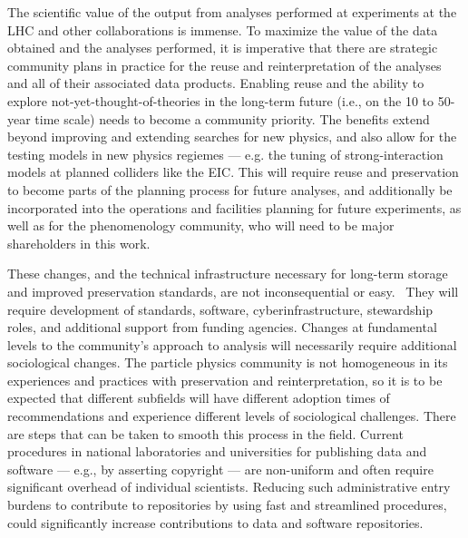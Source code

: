 \documentclass[11pt]{article}
\begin{document}
The scientific value of the output from analyses performed at experiments at the \gls{LHC} and other collaborations is immense.
To maximize the value of the data obtained and the analyses performed, it is imperative that there are strategic community plans in practice for the reuse and reinterpretation of the analyses and all of their associated data products.
Enabling reuse and the ability to explore not-yet-thought-of-theories in the long-term future (i.e., on the 10 to 50-year time scale) needs to become a community priority.
The benefits extend beyond improving and extending searches for new physics, and also allow for the testing models in new physics regiemes --- e.g. the tuning of strong-interaction models at planned colliders like the \gls{EIC}.
This will require reuse and preservation to become parts of the planning process for future analyses, and additionally be incorporated into the operations and facilities planning for future experiments, as well as for the phenomenology community, who will need to be major shareholders in this work.

These changes, and the technical infrastructure necessary for long-term storage and improved preservation standards, are not inconsequential or easy.~\cite{LHCReinterpretationForum:2020xtr,Cranmer:2021urp}
They will require development of standards, software, cyberinfrastructure, stewardship roles, and additional support from funding agencies.
Changes at fundamental levels to the community's approach to analysis will necessarily require additional sociological changes.
The particle physics community is not homogeneous in its experiences and practices with preservation and reinterpretation, so it is to be expected that different subfields will have different adoption times of recommendations and experience different levels of sociological challenges.
There are steps that can be taken to smooth this process in the field.
%
Current procedures in national laboratories and universities for publishing data and software --- e.g., by asserting copyright --- are non-uniform and often require significant overhead of individual scientists.
Reducing such administrative entry burdens to contribute to repositories by using fast and streamlined procedures,
could significantly increase contributions to data and software repositories.
\end{document}
